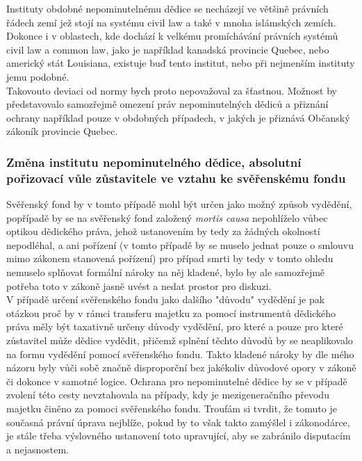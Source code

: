 \documentclass{article}
\begin{document}
Instituty obdobné nepominutelnému dědice se necházejí ve většině právních řádech zemí jež stojí na systému civil law a také v mnoha islámských zemích. Dokonce i v oblastech, kde dochází k velkému promíchávání právních systémů civil law a common law, jako je například kanadská provincie Quebec, nebo americký stát Louisiana, existuje buď tento institut, nebo při nejmenším instituty jemu podobné.\\

Takovouto deviaci od normy bych proto nepovažoval za šťastnou. Možnost by představovalo samozřejmě omezení práv nepominutelných dědiců a přiznání ochrany například pouze v obdobných případech, v jakých je přiznává Občanský zákoník provincie Quebec.


\subsubsection{Změna institutu nepominutelného dědice, absolutní pořizovací vůle zůstavitele ve vztahu ke svěřenskému fondu}

Svěřenský fond by v tomto případě mohl být určen jako možný způsob vydědění, popřípadě by se na svěřenský fond založený \textit{mortis causa} nepohlíželo vůbec optikou dědického práva, jehož ustanovením by tedy za žádných okolností nepodléhal, a ani pořízení (v tomto případě by se muselo jednat pouze o smlouvu mimo zákonem stanovená pořízení) pro případ smrti by tedy v tomto ohledu nemuselo splňovat formální nároky na něj kladené, bylo by ale samozřejmě potřeba toto v zákoně jasně uvést a nedat prostor pro diskuzi.\\

V případě určení svěřenského fondu jako dalšího "důvodu" vydědění je pak otázkou proč by v rámci transferu majetku za pomocí instrumentů dědického práva měly být taxativně určeny důvody vydědění, pro které a pouze pro které zůstavitel může dědice vydědit, přičemž splnění těchto důvodů by se neaplikovalo na formu vydědění pomocí svěřenského fondu. Takto kladené nároky by dle mého názoru byly vůči sobě značně disproporční bez jakékoliv důvodové opory v zákoně či dokonce v samotné logice. Ochrana pro nepominutelné dědice by se v případě zvolení této cesty nevztahovala na případy, kdy je mezigeneračního převodu majetku činěno za pomoci svěřenského fondu. Troufám si tvrdit, že tomuto je současná právní úprava nejblíže, pokud by to však takto zamýšlel i zákonodárce, je stále třeba výslovného ustanovení toto upravující, aby se zabránilo disputacím a nejasnostem.\\
\end{document}
